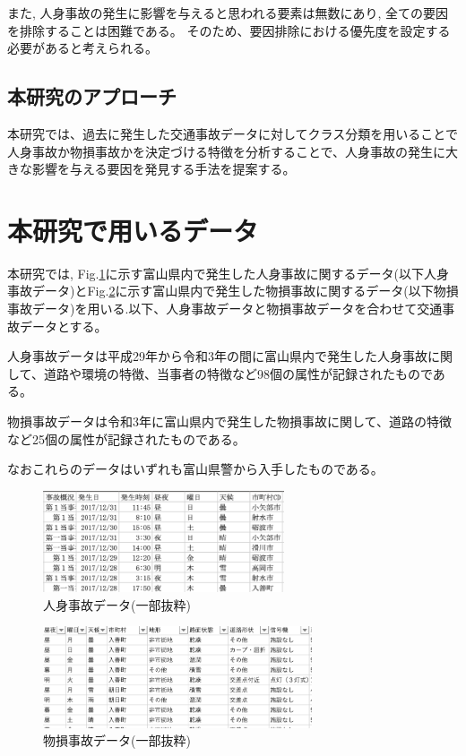 \documentclass[a4j,8.5pt, twocolumn,fleqn]{jbook}
\begin{document}
また, 人身事故の発生に影響を与えると思われる要素は無数にあり, 全ての要因を排除することは困難である。
そのため、要因排除における優先度を設定する必要があると考えられる。

\subsection{本研究のアプローチ}
本研究では、過去に発生した交通事故データに対してクラス分類を用いることで人身事故か物損事故かを決定づける特徴を分析することで、人身事故の発生に大きな影響を与える要因を発見する手法を提案する。



\section{本研究で用いるデータ}
本研究では, Fig.\ref{人身事故データ}に示す富山県内で発生した人身事故に関するデータ(以下人身事故データ)とFig.\ref{物損事故データ}に示す富山県内で発生した物損事故に関するデータ(以下物損事故データ)を用いる.以下、人身事故データと物損事故データを合わせて交通事故データとする。

人身事故データは平成29年から令和3年の間に富山県内で発生した人身事故に関して、道路や環境の特徴、当事者の特徴など98個の属性が記録されたものである。

物損事故データは令和3年に富山県内で発生した物損事故に関して、道路の特徴など25個の属性が記録されたものである。

なおこれらのデータはいずれも富山県警から入手したものである。

\begin{figure}[htb]
    \centering
    \includegraphics[height=30mm]{images/jinshixn.png}
    \vspace{-4mm}
    \caption{人身事故データ(一部抜粋)}
    \label{人身事故データ}
\end{figure}

\begin{figure}[htb]
    \centering
    \includegraphics[height=30mm]{images/bussoxn.png}
    \vspace{-4mm}
    \caption{物損事故データ(一部抜粋)}
    \label{物損事故データ}
\end{figure}
\end{document}
